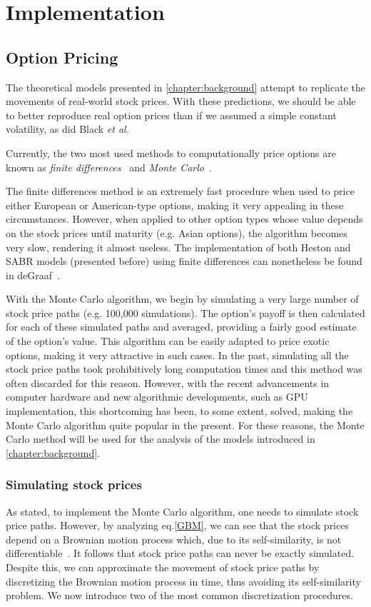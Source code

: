 \chapter{Implementation}
\label{chapter:implementation}
\section{Option Pricing}
\label{section:Option Pricing}
The theoretical models presented in \autoref{chapter:background} attempt to replicate the movements of real-world stock prices. With these predictions, we should be able to better reproduce real option prices than if we assumed a simple constant volatility, as did Black \textit{et al.}

Currently, the two most used methods to computationally price options are known as \emph{finite differences}~\citep{Hull} and \emph{Monte Carlo}~\citep{Glasserman}.

The finite differences method is an extremely fast procedure when used to price either European or American-type options, making it very appealing in these circumstances. However, when applied to other option types whose value depends on the stock prices until maturity (e.g. Asian options), the algorithm becomes very slow, rendering it almost useless.
The implementation of both Heston and SABR models (presented before) using finite differences can nonetheless be found in deGraaf~\citep{deGraaf}.


With the Monte Carlo algorithm, we begin by simulating a very large number of stock price paths (e.g. 100,000 simulations). The option's payoff is then calculated for each of these simulated paths and averaged, providing a fairly good estimate of the option's value. This algorithm can be easily adapted to price exotic options, making it very attractive in such cases.
In the past, simulating all the stock price paths took prohibitively long computation times and this method was often discarded for this reason. However, with the recent advancements in computer hardware and new algorithmic developments, such as GPU implementation, this shortcoming has been, to some extent, solved, making the Monte Carlo algorithm quite popular in the present.
For these reasons, the Monte Carlo method will be used for the analysis of the models introduced in \autoref{chapter:background}.


\subsection{Simulating stock prices}
\label{subsection:Simulating stock prices}
As stated, to implement the Monte Carlo algorithm, one needs to simulate stock price paths. However, by analyzing eq.\eqref{GBM}, we can see that the stock prices depend on a Brownian motion process which, due to its self-similarity, is not differentiable~\citep{Mikosch}. It follows that stock price paths can never be exactly simulated. Despite this, we can approximate the movement of stock price paths by discretizing the Brownian motion process in time, thus avoiding its self-similarity problem. We now introduce two of the most common discretization procedures.


